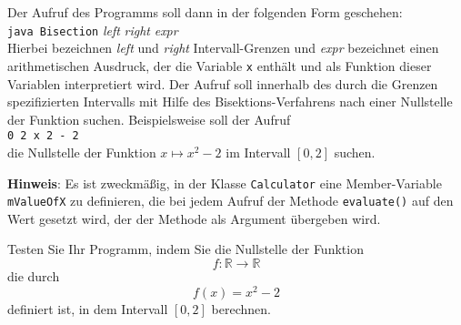 \documentclass{article}
\begin{document}
Der Aufruf des Programms soll dann in der folgenden Form geschehen:
\\[0.2cm]
\hspace*{1.3cm}
\texttt{java Bisection} \textsl{left} \textsl{right} \textsl{expr}
\\[0.2cm]
Hierbei bezeichnen  \textsl{left} und \textsl{right} Intervall-Grenzen und \textsl{expr}
bezeichnet einen arithmetischen Ausdruck, der die Variable \texttt{x} enth\"alt und als
Funktion dieser Variablen interpretiert wird.  Der Aufruf soll innerhalb des
durch die Grenzen spezifizierten Intervalls mit Hilfe des Bisektions-Verfahrens
nach einer Nullstelle der Funktion suchen.  Beispielsweise soll der Aufruf
\\[0.2cm]
\hspace*{1.3cm}
\texttt{0 2 x  2 - 2}
\\[0.2cm]
die Nullstelle der Funktion $x \mapsto x^2 - 2$ im Intervall $[0, 2]$ suchen.
\vspace{0.3cm}

\noindent
\textbf{Hinweis}:  Es ist zweckm\"a{\ss}ig, in der Klasse \texttt{Calculator} eine
Member-Variable \texttt{mValueOfX} zu definieren, die bei jedem Aufruf der Methode
\texttt{evaluate()} auf den Wert gesetzt wird, der der Methode als Argument \"ubergeben wird.
\vspace{0.3cm}

\noindent
Testen Sie Ihr Programm, indem Sie die Nullstelle der Funktion 
\[ f: \mathbb{R} \rightarrow \mathbb{R} \]
die durch 
\[ f(x) = x^2 - 2 \]
definiert ist, in dem Intervall $[0,2]$ berechnen.
\end{document}
